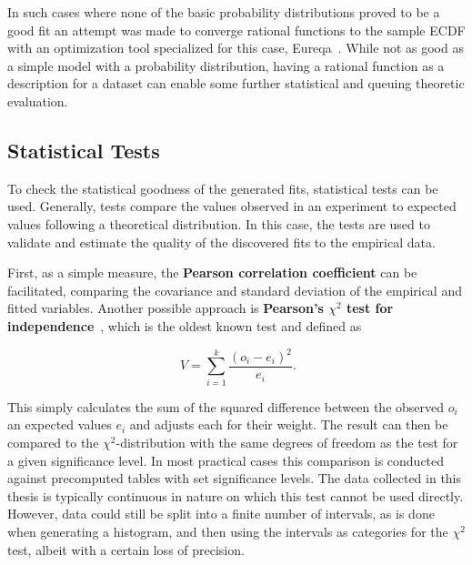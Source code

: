 In such cases where none of the basic probability distributions proved to be a good fit an attempt was made to converge rational functions to the sample \gls{ECDF} with an optimization tool specialized for this case, Eureqa~\cite{eureqa_software, eureqa_paper}. While not as good as a simple model with a probability distribution, having a rational function as a description for a dataset can enable some further statistical and queuing theoretic evaluation.


\subsection{Statistical Tests}

To check the statistical goodness of the generated fits, statistical tests can be used. Generally, tests compare the values observed in an experiment to expected values following a theoretical distribution. In this case, the tests are used to validate and estimate the quality of the discovered fits to the empirical data.

First, as a simple measure, the \textbf{Pearson correlation coefficient} can be facilitated, comparing the covariance and standard deviation of the empirical and fitted variables. Another possible approach is \textbf{Pearson's $\chi^2$ test for independence}~\cite{doi:10.1080/14786440009463897}, which is the oldest known test and defined as

\begin{equation}
	\phantom{.}V=\sum_{i=1}^{k} \frac{(o_i - e_i)^2}{e_i}\text{.}
\end{equation}

This simply calculates the sum of the squared difference between the observed $o_i$ an expected values $e_i$ and adjusts each for their weight. The result can then be compared to the $\chi^2$-distribution with the same degrees of freedom
as the test for a given significance level. In most practical cases this comparison is conducted against precomputed tables with set significance levels. The data collected in this thesis is typically continuous in nature on which this test cannot be used directly. However, data could still be split into a finite number of intervals, as is done when generating a histogram, and then using the intervals as categories for the $\chi^2$ test, albeit with a certain loss of precision.


